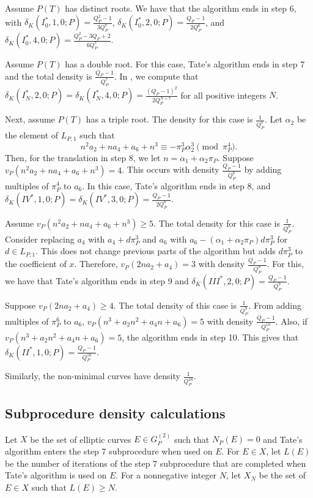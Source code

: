 \documentclass[12pt,letterpaper]{amsart}
\theoremstyle{definition}
\begin{document}
Assume $P(T)$ has distinct roots. We have that the algorithm ends in step 6, with $\delta_K(I_0^*, 1, 0; P)=\frac{Q_P^2-1}{3Q_P^7}$, $\delta_K(I_0^*, 2, 0; P)=\frac{Q_P-1}{2Q_P^6}$, and $\delta_K(I_0^*,4,0;P)=\frac{Q_P^2-3Q_P+2}{6Q_P^7}$.

Assume $P(T)$ has a double root. For this case, Tate's algorithm ends in step 7 and the total density is $\frac{Q_P-1}{Q_P^7}$. In , we compute that $\delta_K(I_N^*,2,0; P)=\delta_K(I_N^*,4,0; P)=\frac{(Q_P-1)^2}{2Q_P^{N+7}}$ for all positive integers $N$.

Next, assume $P(T)$ has a triple root. The density for this case is $\frac{1}{Q_P^7}$. Let $\alpha_2$ be the element of $L_{P,1}$ such that
\[
n^2a_2+na_4+a_6+n^3\equiv -\pi_P^3\alpha_2^3 \pmod{\pi_P^4}.
\]
Then, for the translation in step 8, we let $n=\alpha_1+\alpha_2\pi_P$. Suppose $v_P(n^2a_2+na_4+a_6+n^3)=4$. This occurs with density $\frac{Q_P-1}{Q_P^8}$ by adding multiples of $\pi_P^4$ to $a_6$. In this case, Tate's algorithm ends in step 8, and $\delta_K(IV^*,1,0;P)=\delta_K(IV^*,3,0;P)=\frac{Q_P-1}{2Q_P^8}$.

Assume $v_P(n^2a_2+na_4+a_6+n^3)\geq 5$. The total density for this case is $\frac{1}{Q_P^8}$. Consider replacing $a_4$ with $a_4+d\pi_P^3$ and $a_6$ with $a_6-(\alpha_1+\alpha_2\pi_P)d\pi_P^3$ for $d\in L_{P,1}$. This does not change previous parts of the algorithm but adds $d\pi_P^3$ to the coefficient of $x$. Therefore, $v_P(2na_2+a_4)=3$ with density $\frac{Q_P-1}{Q_P^9}$. For this, we have that Tate's algorithm ends in step 9 and $\delta_K(III^*,2,0;P)=\frac{Q_P-1}{Q_P^9}$.

Suppose $v_P(2na_2+a_4)\geq 4$. The total density of this case is $\frac{1}{Q_P^9}$. From adding multiples of $\pi_P^6$ to $a_6$, $v_P(n^3+a_2n^2+a_4n+a_6)=5$ with density $\frac{Q_P-1}{Q_P^{10}}$. Also, if $v_P(n^3+a_2n^2+a_4n+a_6)=5$, the algorithm ends in step 10. This gives that $\delta_K(II^*,1,0;P)=\frac{Q_P-1}{Q_P^{10}}$.

Similarly, the non-minimal curves have density $\frac{1}{Q_P^{10}}$.

\subsection{Subprocedure density calculations}
\label{subsec:subden2}

Let $X$ be the set of elliptic curves $E\in G_P^{(2)}$ such that $N_P(E)=0$ and Tate's algorithm enters the step 7 subprocedure when used on $E$. For $E\in X$, let $L(E)$ be the number of iterations of the step 7 subprocedure that are completed when Tate's algorithm is used on $E$. For a nonnegative integer $N$, let $X_N$ be the set of $E\in X$ such that $L(E)\geq N$. 
\end{document}
